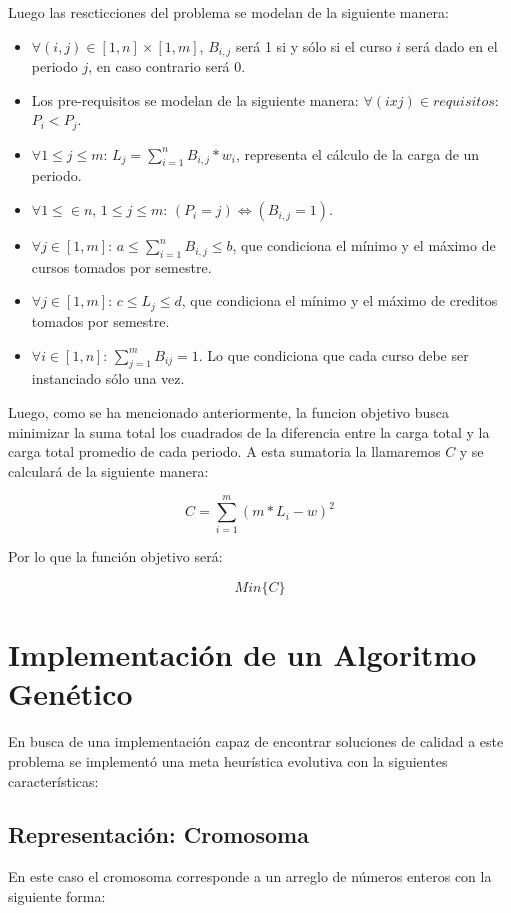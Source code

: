 \documentclass[letter, 10pt]{article}
\begin{document}
Luego las rescticciones del problema se modelan de la siguiente manera:
\begin{itemize}
\item $\forall (i,j) \in [1,n] \times [1,m]$, $B_{i,j}$ será 1 si y sólo si
  el curso $i$ será dado en el periodo $j$, en caso contrario será 0.
 \item Los pre-requisitos se modelan de la siguiente manera: $\forall (i x j) \in
   requisitos$: $P_{i} < P_{j}$.
 \item $\forall 1 \leq j \leq m$: $L_{j} = \sum_{i=1}^{n}{B_{i,j}*w_i}$,
   representa el cálculo de la carga de un periodo.
 \item $\forall 1 \leq \in n$, $1 \leq j \leq m$: $(P_{i}=j) \Leftrightarrow   (B_{i,j}=1)$.
 \item $\forall j \in [1,m]$: $a \leq \sum_{i=1}^{n}{B_{i,j}} \leq b$, que
   condiciona el mínimo y el máximo de cursos tomados por semestre.
 \item $\forall j \in [1,m]$: $c \leq L_{j} \leq d$, que condiciona el
   mínimo y el máximo de creditos tomados por semestre.
 \item $\forall i \in [1,n]$: $\sum_{j=1}^{m}{B_{ij}=1}$. Lo que
   condiciona que cada curso debe ser instanciado sólo una
   vez.
\end{itemize}

Luego, como se ha mencionado anteriormente, la funcion objetivo busca
minimizar la suma total los cuadrados de la diferencia entre la carga
total y la carga total promedio de cada periodo. A esta sumatoria la
llamaremos $C$ y se calculará de la siguiente manera:

\begin{equation*}
  C = \sum_{i=1}^{m}{(m*L_{i}-w)^{2}}
\end{equation*}

Por lo que la función objetivo será:

\begin{equation*}
  Min\{C\}
\end{equation*}


\section{Implementación de un Algoritmo Genético}
En busca de una implementación capaz de encontrar soluciones de
calidad a este problema se implementó una meta heurística evolutiva
con la siguientes características:

\subsection{Representación: Cromosoma}
En este caso el cromosoma corresponde a un arreglo de números enteros con la siguiente forma:
\end{document}
